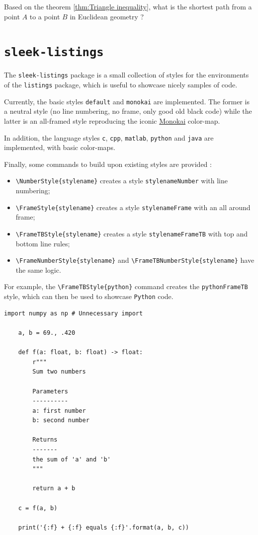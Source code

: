 \documentclass[a4paper, 12pt]{report}
\def\tbs{\textbackslash}
\begin{document}
    \begin{framedquest*}
        Based on the theorem \ref{thm:Triangle inequality}, what is the shortest path from a point $A$ to a point $B$ in Euclidean geometry ?
    \end{framedquest*}

    \newpage

    \section{\texttt{sleek-listings}}

    The \texttt{sleek-listings} package is a small collection of styles for the environments of the \texttt{listings} package, which is useful to showcase nicely samples of code.

    Currently, the basic styles \texttt{default} and \texttt{monokai} are implemented. The former is a neutral style (no line numbering, no frame, only good old black code) while the latter is an all-framed style reproducing the iconic \href{https://monokai.nl/}{Monokai} color-map.

    In addition, the language styles \texttt{c}, \texttt{cpp}, \texttt{matlab}, \texttt{python} and \texttt{java} are implemented, with basic color-maps.

    Finally, some commands to build upon existing styles are provided :

    \begin{itemize}
        \item \texttt{\tbs{}NumberStyle\{stylename\}} creates a style \texttt{stylenameNumber} with line numbering;
        \item \texttt{\tbs{}FrameStyle\{stylename\}} creates a style \texttt{stylenameFrame} with an all around frame;
        \item \texttt{\tbs{}FrameTBStyle\{stylename\}} creates a style \texttt{stylenameFrameTB} with top and bottom line rules;
        \item \texttt{\tbs{}FrameNumberStyle\{stylename\}} and \texttt{\tbs{}FrameTBNumberStyle\{stylename\}} have the same logic.
    \end{itemize}

    For example, the \texttt{\tbs{}FrameTBStyle\{python\}} command creates the \texttt{pythonFrameTB} style, which can then be used to showcase \texttt{Python} code.

    \begin{lstlisting}[style=pythonFrameTB, gobble=4]
    import numpy as np # Unnecessary import

    a, b = 69., .420

    def f(a: float, b: float) -> float:
        r"""
        Sum two numbers

        Parameters
        ----------
        a: first number
        b: second number

        Returns
        -------
        the sum of 'a' and 'b'
        """

        return a + b

    c = f(a, b)

    print('{:f} + {:f} equals {:f}'.format(a, b, c))
    \end{lstlisting}
\end{document}
